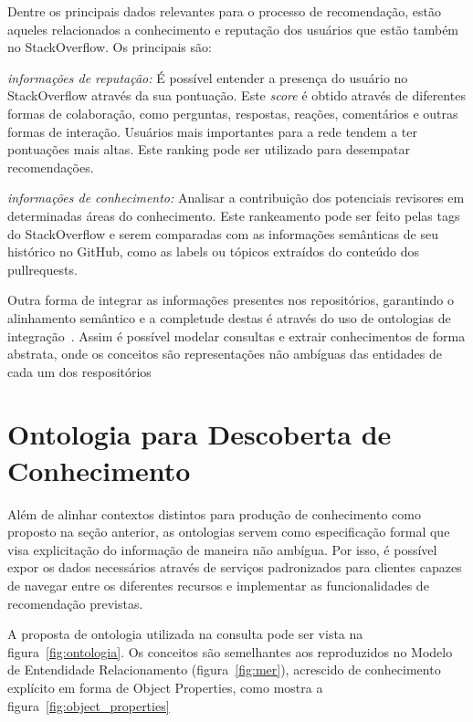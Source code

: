 \documentclass[a4paper,12pt]{monografia}
\theoremstyle{plain}
\theoremstyle{definition}
\theoremstyle{remark}
\begin{document}
Dentre os principais dados relevantes para o processo de recomendação, estão aqueles relacionados a conhecimento e reputação dos usuários que estão também no StackOverflow. Os principais são:

\textit{informações de reputação: } É possível entender a presença do usuário no StackOverflow através da sua pontuação. Este \textit{score} é obtido através de diferentes formas de colaboração, como perguntas, respostas, reações, comentários e outras formas de interação. Usuários mais importantes para a rede tendem a ter pontuações mais altas. Este ranking pode ser utilizado para desempatar recomendações.

\textit{informações de conhecimento: } Analisar a contribuição dos potenciais revisores em determinadas áreas do conhecimento. Este rankeamento pode ser feito pelas tags do StackOverflow e serem comparadas com as informações semânticas de seu histórico no GitHub, como as labels ou tópicos extraídos do conteúdo dos pullrequests.

Outra forma de integrar as informações presentes nos repositórios, garantindo o alinhamento semântico e a completude destas é através do uso de ontologias de integração~\cite{pinto2001}. Assim é possível modelar consultas e extrair conhecimentos de forma abstrata, onde os conceitos são representações não ambíguas das entidades de cada um dos respositórios~\cite{calvanese2002}

\section{Ontologia para Descoberta de Conhecimento}

Além de alinhar contextos distintos para produção de conhecimento como proposto na seção anterior, as ontologias servem como especificação formal que visa explicitação do informação de maneira não ambígua. Por isso, é possível expor os dados necessários através de serviços padronizados para clientes capazes de navegar entre os diferentes recursos e implementar as funcionalidades de recomendação previstas.

A proposta de ontologia utilizada na consulta pode ser vista na figura~\ref{fig:ontologia}. Os conceitos são semelhantes aos reproduzidos no Modelo de Entendidade Relacionamento (figura~\ref{fig:mer}), acrescido de conhecimento explícito em forma de Object Properties, como mostra a figura~\ref{fig:object_properties}
\end{document}
